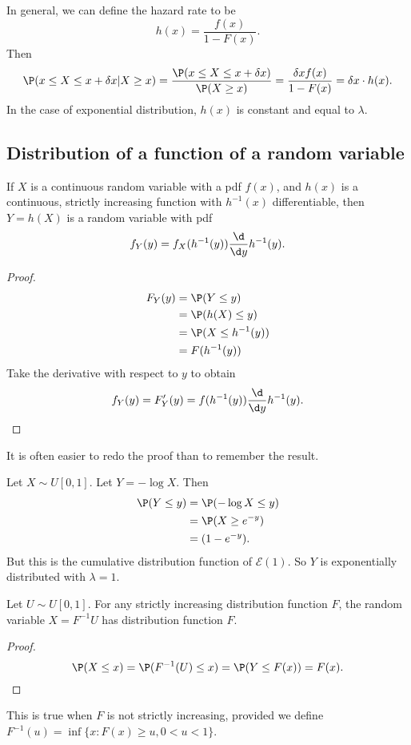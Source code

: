 \documentclass[a4paper]{article}
\begin{document}
In general, we can define the hazard rate to be
\[
  h(x) = \frac{f(x)}{1 - F(x)}.
\]
Then
\[
  \P(x \leq X \leq x + \delta x | X \geq x) = \frac{\P(x \leq X \leq x + \delta x)}{\P(X \geq x)} = \frac{\delta x f(x)}{1 - F(x)} = \delta x\cdot h(x).
\]
In the case of exponential distribution, $h(x)$ is constant and equal to $\lambda$.
\subsection{Distribution of a function of a random variable}
\begin{thm}
  If $X$ is a continuous random variable with a pdf $f(x)$, and $h(x)$ is a continuous, strictly increasing function with $h^{-1}(x)$ differentiable, then $Y = h(X)$ is a random variable with pdf
  \[
    f_Y(y) = f_X(h^{-1}(y))\frac{\d }{\d y}h^{-1}(y).
  \]
\end{thm}
\begin{proof}
  \begin{align*}
    F_Y(y) &= \P(Y \leq y)\\
    &= \P(h(X) \leq y)\\
    &= \P(X \leq h^{-1}(y))\\
    &= F(h^{-1}(y))
  \end{align*}
  Take the derivative with respect to $y$ to obtain
  \[
    f_Y(y) = F'_Y(y) = f(h^{-1}(y))\frac{\d}{\d y}h^{-1}(y).
  \]
\end{proof}
It is often easier to redo the proof than to remember the result.

\begin{eg}
  Let $X\sim U[0, 1]$. Let $Y = -\log X$. Then
  \begin{align*}
    \P(Y \leq y) &= \P(-\log X \leq y)\\
    &= \P(X \geq e^{-y})\\
    &= (1 - e^{-y}).
  \end{align*}
  But this is the cumulative distribution function of $\mathcal{E}(1)$. So $Y$ is exponentially distributed with $\lambda = 1$.
\end{eg}

\begin{thm}
  Let $U\sim U[0, 1]$. For any strictly increasing distribution function $F$, the random variable $X = F^{-1}U$ has distribution function $F$.
\end{thm}

\begin{proof}
  \[
    \P(X \leq x) = \P(F^{-1}(U) \leq x) = \P(Y \leq F(x)) = F(x).
  \]
\end{proof}
\note This is true when $F$ is not strictly increasing, provided we define $F^{-1}(u) = \inf\{x: F(x)\geq u, 0 < u < 1\}$.
\end{document}
